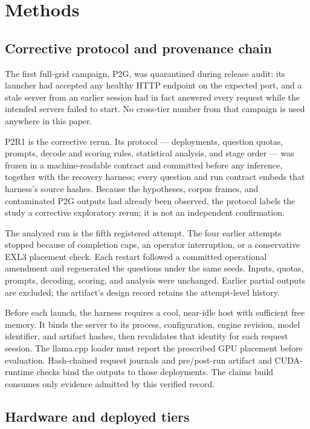 \documentclass[11pt]{article}
\begin{document}
\section{Methods}\label{sec:methods}

\subsection{Corrective protocol and provenance chain}\label{sec:protocol}

The first full-grid campaign, P2G, was quarantined during release audit: its
launcher had accepted any healthy HTTP endpoint on the expected port, and a
stale server from an earlier session had in fact answered every request while
the intended servers failed to start. No cross-tier number from that campaign
is used anywhere in this paper.

P2R1 is the corrective rerun. Its protocol --- deployments, question quotas,
prompts, decode and scoring rules, statistical analysis, and stage order ---
was frozen in a machine-readable contract and committed before any inference,
together with the recovery harness; every question and run contract embeds
that harness's source hashes. Because the hypotheses, corpus frames, and
contaminated P2G outputs had already been observed, the protocol labels the
study a corrective exploratory rerun; it is not an independent confirmation.

The analyzed run is the fifth registered attempt. The four earlier attempts
stopped because of completion caps, an operator interruption, or a conservative
EXL3 placement check. Each restart followed a committed operational amendment
and regenerated the questions under the same seeds. Inputs, quotas, prompts,
decoding, scoring, and analysis were unchanged. Earlier partial outputs are
excluded; the artifact's design record retains the attempt-level history.

Before each launch, the harness requires a cool, near-idle host with sufficient
free memory. It binds the server to its process, configuration, engine revision,
model identifier, and artifact hashes, then revalidates that identity for each
request session. The llama.cpp loader must report the prescribed GPU placement
before evaluation. Hash-chained request journals and pre/post-run artifact and
CUDA-runtime checks bind the outputs to those deployments. The claims build
consumes only evidence admitted by this verified record.

\subsection{Hardware and deployed tiers}
\end{document}
